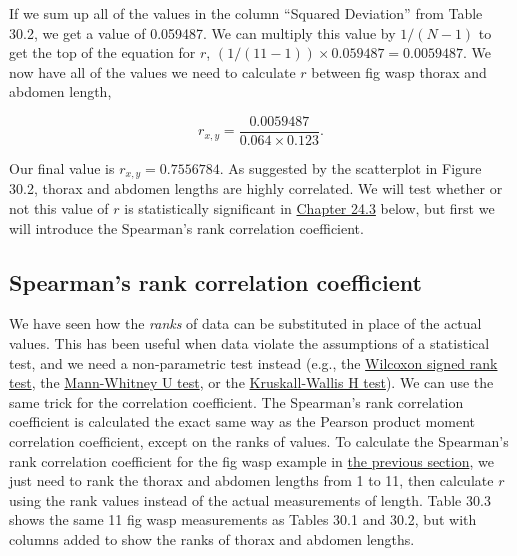 \documentclass[
  openany]{krantz}
\begin{document}
If we sum up all of the values in the column ``Squared Deviation'' from Table 30.2, we get a value of 0.059487.
We can multiply this value by \(1 / (N - 1)\) to get the top of the equation for \(r\), \((1 / (11-1)) \times 0.059487 = 0.0059487\).
We now have all of the values we need to calculate \(r\) between fig wasp thorax and abdomen length,

\[r_{x,y} = \frac{0.0059487}{0.064 \times 0.123}.\]

Our final value is \(r_{x, y} = 0.7556784\).
As suggested by the scatterplot in Figure 30.2, thorax and abdomen lengths are highly correlated.
We will test whether or not this value of \(r\) is statistically significant in \protect\hyperlink{correlation-hypothesis-testing}{Chapter 24.3} below, but first we will introduce the Spearman's rank correlation coefficient.

\hypertarget{spearmans-rank-correlation-coefficient}{%
\subsection{Spearman's rank correlation coefficient}\label{spearmans-rank-correlation-coefficient}}

We have seen how the \emph{ranks} of data can be substituted in place of the actual values.
This has been useful when data violate the assumptions of a statistical test, and we need a non-parametric test instead (e.g., the \protect\hyperlink{wilcoxon-test-1}{Wilcoxon signed rank test}, the \protect\hyperlink{mann-whitney-u-test-1}{Mann-Whitney U test}, or the \protect\hyperlink{Chapter_26}{Kruskall-Wallis H test}).
We can use the same trick for the correlation coefficient.
The Spearman's rank correlation coefficient is calculated the exact same way as the Pearson product moment correlation coefficient, except on the ranks of values.
To calculate the Spearman's rank correlation coefficient for the fig wasp example in \protect\hyperlink{pearson-product-moment-correlation-coefficient}{the previous section}, we just need to rank the thorax and abdomen lengths from 1 to 11, then calculate \(r\) using the rank values instead of the actual measurements of length.
Table 30.3 shows the same 11 fig wasp measurements as Tables 30.1 and 30.2, but with columns added to show the ranks of thorax and abdomen lengths.
\end{document}
